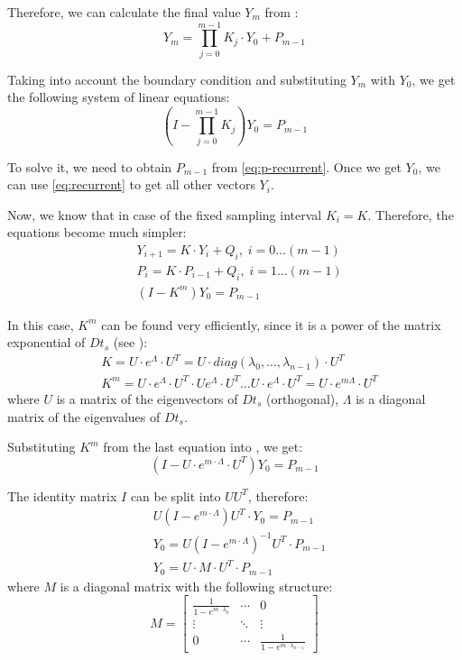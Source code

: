 Therefore, we can calculate the final value $Y_m$ from :
\[
  Y_m = \prod_{j = 0}^{m - 1} K_j \cdot Y_0 + P_{m - 1}
\]

Taking into account the boundary condition  and substituting $Y_m$ with $Y_0$, we get the following system of linear equations:
\[
  (I - \prod_{j = 0}^{m - 1} K_j) Y_0 = P_{m - 1}
\]

To solve it, we need to obtain $P_{m - 1}$ from \eqref{eq:p-recurrent}. Once we get $Y_0$, we can use \eqref{eq:recurrent} to get all other vectors $Y_i$.

Now, we know that in case of the fixed sampling interval $K_i = K$. Therefore, the equations become much simpler:
\begin{align}
  & Y_{i + 1} = K \cdot Y_i + Q_i, \; i = 0 \dots (m - 1) \nonumber \\
  & P_i = K \cdot P_{i - 1} + Q_i, \; i = 1 \dots (m - 1) \nonumber \\
  & (I - K^m) Y_0 = P_{m - 1} \label{eq:linear-system}
\end{align}

In this case, $K^m$ can be found very efficiently, since it is a power of the matrix exponential of $D t_s$ (see ):
\begin{align*}
  & K = U \cdot e^{\Lambda} \cdot U^T = U \cdot diag(\lambda_0, \dots, \lambda_{n - 1}) \cdot U^T \\
  & K^m = U \cdot e^{\Lambda} \cdot U^T \cdot U e^{\Lambda} \cdot U^T \dots U \cdot e^{\Lambda} \cdot U^T = U \cdot e^{m \Lambda} \cdot U^T
\end{align*}
where $U$ is a matrix of the eigenvectors of $D t_s$ (orthogonal), $\Lambda$ is a diagonal matrix of the eigenvalues of $D t_s$.

Substituting $K^m$ from the last equation into , we get:
\[
  (I - U \cdot e^{m \cdot \Lambda} \cdot U^T) Y_0 = P_{m - 1}
\]

The identity matrix $I$ can be split into $U U^T$, therefore:
\begin{align*}
  & U (I - e^{m \cdot \Lambda}) U^T \cdot Y_0 = P_{m - 1} \\
  & Y_0 = U (I - e^{m \cdot \Lambda})^{-1} U^T \cdot P_{m - 1} \\
  & Y_0 = U \cdot M \cdot U^T \cdot P_{m - 1}
\end{align*}
where $M$ is a diagonal matrix with the following structure:
\[
  M = \left[
    \begin{array}{ccc}
      \frac{1}{1 - e^{m \cdot \lambda_0}} & \cdots & 0 \\
      \vdots & \ddots & \vdots \\
      0 & \cdots & \frac{1}{1 - e^{m \cdot \lambda_{n - 1}}}
    \end{array}
  \right]
\]

